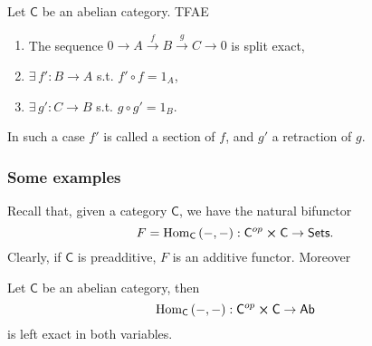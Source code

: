 \begin{prop}
	Let $\mathsf{C}$ be an abelian category.
	TFAE
	\begin{enumerate}
		\item The sequence $0 \to A \xrightarrow{f} B \xrightarrow{g} C \to 0$ is split exact,
		\item $\exists\, f': B \to A$ s.t. $f' \circ f = 1_A$,
		\item $\exists\, g': C \to B$ s.t. $g \circ g' = 1_B$.
	\end{enumerate}
	In such a case $f'$ is called a section of $f$, and $g'$ a retraction of $g$.
\end{prop} 

\subsubsection{Some examples}
Recall that, given a category $\mathsf{C}$, we have the natural bifunctor
\begin{equation}
F = \mathrm{Hom}_{\mathsf{C}} \left( - , - \right): \mathsf{C}^{op} \cross \mathsf{C} \to \mathsf{Sets}
.\end{equation} 
Clearly, if $\mathsf{C}$ is preadditive, $F$ is an additive functor. Moreover

\begin{prop}
	Let $\mathsf{C}$ be an abelian category, then
	\begin{equation}
	\mathrm{Hom}_{\mathsf{C}} \left( -, - \right): \mathsf{C}^{op} \cross \mathsf{C} \to \mathsf{Ab}
	\end{equation} 
	is left exact in both variables.
\end{prop} 

